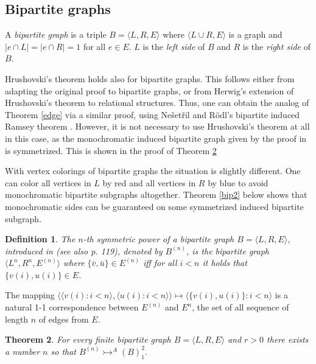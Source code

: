\documentclass[11pt]{amsart}
\newcommand{\ars}{\rightarrowtail}
\newcommand{\rng}{\rangle}
\newcommand{\lng}{\langle}
\newtheorem{theorem}{Theorem}[section]
\newtheorem{definition}[theorem]{Definition}
\begin{document}
\subsection{Bipartite graphs}



A \emph{bipartite graph} is a triple $B=\lng L,R,E\rng$ where
$\lng L\cup R, E\rng$ is a graph and  $|e\cap L|=|e\cap R|=1$ for
all $e\in E$. $L$ is the \emph{left side} of $B$ and $R$ is the
\emph{ right side} of $B$.

Hrushovski's theorem holds also for bipartite graphs. This follows
either from adapting the original proof to bipartite graphs, or
from Herwig's extension \cite{H} of Hrushovski's theorem to
relational structures. Thus, one can obtain the analog of Theorem
\ref{edge} via a similar proof, using Ne\v set\v ril and R\"
odl's bipartite induced Ramsey theorem \cite{NR76}. However, it
is not necessary to use Hrushovski's theorem at all in this case,
as the monochromatic induced bipartite graph given by the proof
in \cite{NR76} is symmetrized. This is shown in the proof of
Theorem \ref{bip1}

With vertex colorings of bipartite graphs the situation is
slightly different. One can  color all vertices in $L$ by red and
all vertices in $R$ by blue to avoid monochromatic bipartite
subgraphs altogether. Theorem \ref{bip2} below shows that
monochromatic sides can  be guaranteed on some symmetrized induced
bipartite subgraph.

\begin{definition}
  The \emph{$n$-th symmetric power} of a bipartite graph $B=\lng L,R,
  E\rng$, introduced in \cite{NR76} (see also \cite{GRS} p. 119),
denoted by
  $B^{(n)}$, is the bipartite graph $\lng L^n, R^n, E^{(n)}\rng$ where
  $\{\bar v, \bar u\}\in E^{(n)}$ iff for all $i<n$ it holds that
  $\{v(i),u(i)\}\in E$.
\end{definition}

The mapping $\lng \lng v(i):i<n\rng, \lng u(i):i<n\rng\rng\mapsto
\lng \{v(i),u(i)\}:i<n\rng$ is a natural 1-1 correspondence
between $E^{(n)}$ and $E^n$, the set of all sequence of length
$n$ of edges from $E$.

\begin{theorem}\label{bip1}
  For every finite bipartite graph $B=\lng L, R, E\rng$ and $r>0$
  there exists a number $n$ so that $B^{(n)}\ars^A (B)^2_1$.
\end{theorem}
\end{document}
